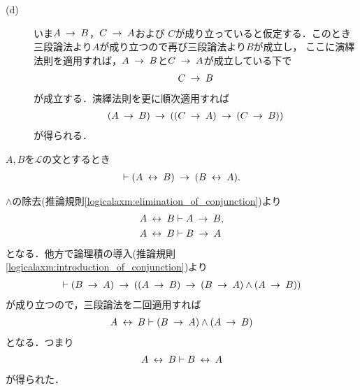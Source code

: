 \begin{prf}
\begin{description}
			\item[(d)]
				いま$A \rarrow B$，$C \rarrow A$および
				$C$が成り立っていると仮定する．このとき三段論法より$A$が成り立つので再び三段論法より$B$が成立し，
				ここに演繹法則を適用すれば，$A \rarrow B$と$C \rarrow A$が成立している下で
				\begin{align}
					C \rarrow B
				\end{align}
				が成立する．演繹法則を更に順次適用すれば
				\begin{align}
					(A \rarrow B) \rarrow ( (C \rarrow A) \rarrow (C \rarrow B) )
				\end{align}
				が得られる．
				\QED
		\end{description}
	\end{prf}
	
	\begin{screen}
		\begin{logicalthm}[同値記号の対称律]
		\label{logicalthm:symmetry_of_equivalence_arrows}
			$A,B$を$\mathcal{L}$の文とするとき
			\begin{align}
				\vdash (A \lrarrow B) \rarrow (B \lrarrow A).
			\end{align}
		\end{logicalthm}
	\end{screen}
	
	\begin{prf}
		$\wedge$の除去(推論規則\ref{logicalaxm:elimination_of_conjunction})より
		\begin{align}
			A \lrarrow B &\vdash A \rarrow B, \\
			A \lrarrow B &\vdash B \rarrow A
		\end{align}
		となる．他方で論理積の導入(推論規則\ref{logicalaxm:introduction_of_conjunction})より
		\begin{align}
			\vdash (B \rarrow A) \rarrow ((A \rarrow B) \rarrow 
			(B \rarrow A) \wedge (A \rarrow B))
		\end{align}
		が成り立つので，三段論法を二回適用すれば
		\begin{align}
			A \lrarrow B \vdash (B \rarrow A) \wedge (A \rarrow B)
		\end{align}
		となる．つまり
		\begin{align}
			A \lrarrow B \vdash B \lrarrow A
		\end{align}
		が得られた．
		\QED
	\end{prf}
	
